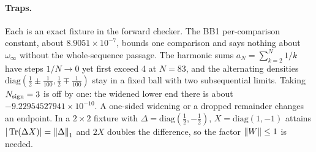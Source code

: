 \paragraph{Traps.} Each is an exact fixture in the forward checker. The BB1
per-comparison constant, about $8.9051\times10^{-7}$, bounds one comparison
and says nothing about $\omega_\infty$ without the whole-sequence passage. The
harmonic sums $a_N=\sum_{k=2}^N1/k$ have steps $1/N\to0$ yet first exceed 4
at $N=83$, and the alternating densities
$\mathrm{diag}(\tfrac12\pm\tfrac1{100},\tfrac12\mp\tfrac1{100})$ stay in a
fixed ball with two subsequential limits. Taking $N_{\rm sign}=3$ is off by
one: the widened lower end there is about $-9.22954527941\times10^{-10}$. A
one-sided widening or a dropped remainder changes an endpoint. In a $2\times2$
fixture with $\Delta=\mathrm{diag}(\tfrac12,-\tfrac12)$, $X=\mathrm{diag}(1,-1)$
attains $|\operatorname{Tr}(\Delta X)|=\left\lVert\Delta\right\rVert_1$ and $2X$ doubles the
difference, so the factor $\left\lVert W\right\rVert\le1$ is needed.

